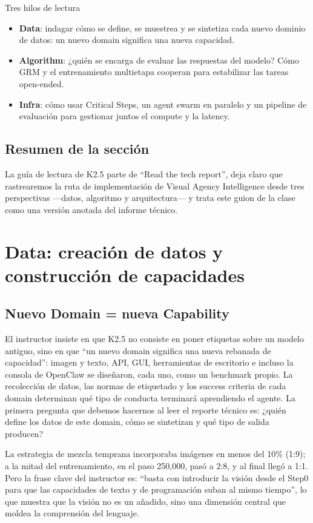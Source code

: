 \documentclass[a4paper]{article}
\begin{document}
\begin{knowledgebox}{Tres hilos de lectura}
\begin{itemize}
    \item \textbf{Data}: indagar cómo se define, se muestrea y se sintetiza cada nuevo dominio de datos: un nuevo domain significa una nueva capacidad.
    \item \textbf{Algorithm}: ¿quién se encarga de evaluar las respuestas del modelo? Cómo GRM y el entrenamiento multietapa cooperan para estabilizar las tareas open-ended.
    \item \textbf{Infra}: cómo usar Critical Steps, un agent swarm en paralelo y un pipeline de evaluación para gestionar juntos el compute y la latency.
\end{itemize}
\end{knowledgebox}

\subsection{Resumen de la sección}
La guía de lectura de K2.5 parte de ``Read the tech report'', deja claro que rastrearemos la ruta de implementación de Visual Agency Intelligence desde tres perspectivas —datos, algoritmo y arquitectura— y trata este guion de la clase como una versión anotada del informe técnico.
\section{Data: creación de datos y construcción de capacidades}

\subsection{Nuevo Domain = nueva Capability}
El instructor insiste en que K2.5 no consiste en poner etiquetas sobre un modelo antiguo, sino en que ``un nuevo domain significa una nueva rebanada de capacidad'': imagen y texto, API, GUI, herramientas de escritorio e incluso la consola de OpenClaw se diseñaron, cada uno, como un benchmark propio. La recolección de datos, las normas de etiquetado y los success criteria de cada domain determinan qué tipo de conducta terminará aprendiendo el agente. La primera pregunta que debemos hacernos al leer el reporte técnico es: ¿quién define los datos de este domain, cómo se sintetizan y qué tipo de salida producen?

La estrategia de mezcla temprana incorporaba imágenes en menos del 10\% (1:9); a la mitad del entrenamiento, en el paso 250,000, pasó a 2:8, y al final llegó a 1:1. Pero la frase clave del instructor es: ``basta con introducir la visión desde el Step0 para que las capacidades de texto y de programación suban al mismo tiempo'', lo que muestra que la visión no es un añadido, sino una dimensión central que moldea la comprensión del lenguaje.
\end{document}
